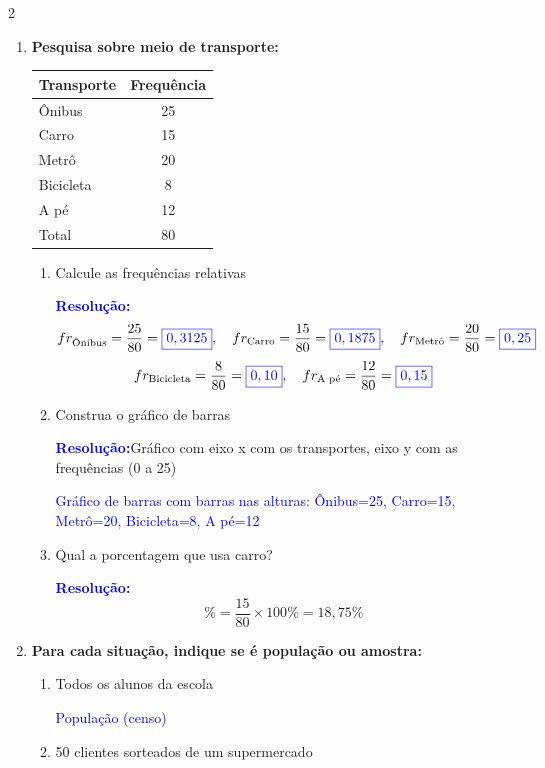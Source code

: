 \documentclass[11pt]{article}
\newcommand{\respostaNum}[1]{\textcolor{blue}{\boxed{#1}}}   %
\newcommand{\respostaTxt}[1]{\textcolor{blue}{#1}}           %
\newcommand{\resolucao}{\textbf{\textcolor{blue}{Resolução:}}}
\begin{document}
\begin{multicols}{2}
\begin{enumerate}[leftmargin=*]
\item \textbf{Pesquisa sobre meio de transporte:}

\begin{center}
\begin{tabular}{|l|c|}
\hline
\textbf{Transporte} & \textbf{Frequência} \\
\hline
Ônibus & 25 \\
Carro & 15 \\
Metrô & 20 \\
Bicicleta & 8 \\
A pé & 12 \\
\hline
Total & 80 \\
\hline
\end{tabular}
\end{center}

\begin{enumerate}[label=\alph*)]
\item Calcule as frequências relativas

\resolucao
\[
fr_{\text{Ônibus}} = \frac{25}{80} = \respostaNum{0,3125}, \quad
fr_{\text{Carro}} = \frac{15}{80} = \respostaNum{0,1875}, \quad
fr_{\text{Metrô}} = \frac{20}{80} = \respostaNum{0,25}
\]
\[
fr_{\text{Bicicleta}} = \frac{8}{80} = \respostaNum{0,10}, \quad
fr_{\text{A pé}} = \frac{12}{80} = \respostaNum{0,15}
\]

\item Construa o gráfico de barras

\resolucao Gráfico com eixo x com os transportes, eixo y com as frequências (0 a 25)

\respostaTxt{Gráfico de barras com barras nas alturas: Ônibus=25, Carro=15, Metrô=20, Bicicleta=8, A pé=12}

\item Qual a porcentagem que usa carro?

\resolucao
\[
\% = \frac{15}{80} \times 100\% = 18,75\%
\]
\respostaNum{18,75\%}
\end{enumerate}

\item \textbf{Para cada situação, indique se é população ou amostra:}

\begin{enumerate}[label=\alph*)]
\item Todos os alunos da escola

\respostaTxt{População (censo)}

\item 50 clientes sorteados de um supermercado


\end{enumerate}
\end{enumerate}
\end{multicols}
\end{document}
